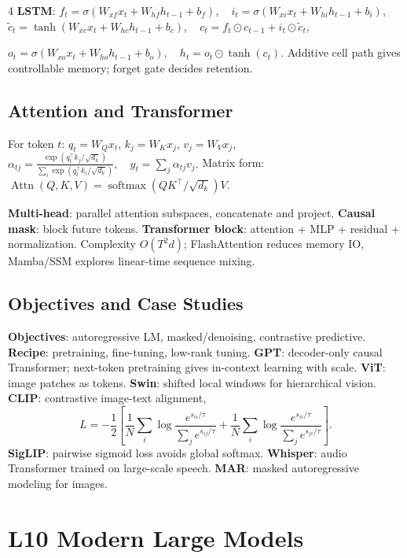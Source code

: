 \documentclass{article}
\newcommand{\key}[1]{\textbf{#1}}
\newcommand{\1}{\mathbf 1}
\DeclareMathOperator{\softmax}{softmax}
\begin{document}
\begin{multicols*}{4}
\key{LSTM}:
\(
f_t=\sigma(W_{xf}x_t+W_{hf}h_{t-1}+b_f),\quad
i_t=\sigma(W_{xi}x_t+W_{hi}h_{t-1}+b_i),
\)
\(
\tilde c_t=\tanh(W_{xc}x_t+W_{hc}h_{t-1}+b_c),\quad
c_t=f_t\odot c_{t-1}+i_t\odot\tilde c_t,
\)

\(
o_t=\sigma(W_{xo}x_t+W_{ho}h_{t-1}+b_o),\quad
h_t=o_t\odot\tanh(c_t).
\)
Additive cell path gives controllable memory; forget gate decides retention.

\subsection{Attention and Transformer}
For token $t$: $q_t=W_Qx_t$, $k_j=W_Kx_j$, $v_j=W_Vx_j$,
\(
\alpha_{tj}=\frac{\exp(q_t^\top k_j/\sqrt{d_k})}{\sum_i\exp(q_t^\top k_i/\sqrt{d_k})},\quad
y_t=\sum_j\alpha_{tj}v_j.
\)
Matrix form:
\(
\operatorname{Attn}(Q,K,V)=\softmax(QK^\top/\sqrt{d_k})V.
\)

\key{Multi-head}: parallel attention subspaces, concatenate and project. \key{Causal mask}: block future tokens. \key{Transformer block}: attention + MLP + residual + normalization. Complexity $O(T^2d)$; FlashAttention reduces memory IO, Mamba/SSM explores linear-time sequence mixing.

\subsection{Objectives and Case Studies}
\key{Objectives}: autoregressive LM, masked/denoising, contrastive predictive. \key{Recipe}: pretraining, fine-tuning, low-rank tuning. \key{GPT}: decoder-only causal Transformer; next-token pretraining gives in-context learning with scale. \key{ViT}: image patches as tokens. \key{Swin}: shifted local windows for hierarchical vision. \key{CLIP}: contrastive image-text alignment,
\[
L=-\frac12\left[\frac1N\sum_i\log\frac{e^{s_{ii}/\tau}}{\sum_j e^{s_{ij}/\tau}}+
\frac1N\sum_i\log\frac{e^{s_{ii}/\tau}}{\sum_j e^{s_{ji}/\tau}}\right].
\]
\key{SigLIP}: pairwise sigmoid loss avoids global softmax. \key{Whisper}: audio Transformer trained on large-scale speech. \key{MAR}: masked autoregressive modeling for images.

\section{L10 Modern Large Models}

\end{multicols*}
\end{document}
